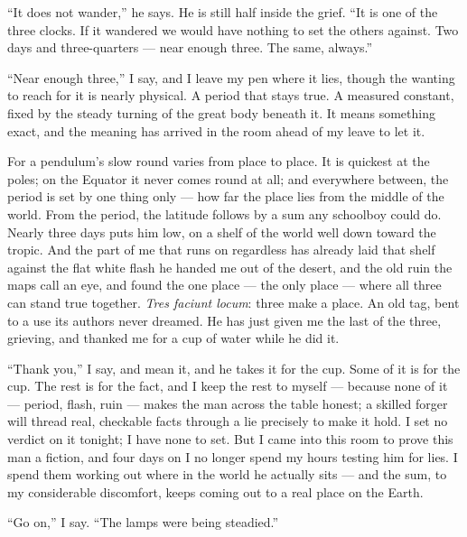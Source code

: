 ``It does not wander,'' he says. He is still half inside the grief. ``It is one of the three clocks. If it wandered we would have nothing to set the others against. Two days and three-quarters --- near enough three. The same, always.''\par

``Near enough three,'' I say, and I leave my pen where it lies, though the wanting to reach for it is nearly physical. A period that stays true. A measured constant, fixed by the steady turning of the great body beneath it. It means something exact, and the meaning has arrived in the room ahead of my leave to let it.\par

For a pendulum's slow round varies from place to place. It is quickest at the poles; on the Equator it never comes round at all; and everywhere between, the period is set by one thing only --- how far the place lies from the middle of the world. From the period, the latitude follows by a sum any schoolboy could do. Nearly three days puts him low, on a shelf of the world well down toward the tropic. And the part of me that runs on regardless has already laid that shelf against the flat white flash he handed me out of the desert, and the old ruin the maps call an eye, and found the one place --- the only place --- where all three can stand true together. \textit{Tres faciunt locum}: three make a place. An old tag, bent to a use its authors never dreamed. He has just given me the last of the three, grieving, and thanked me for a cup of water while he did it.\par

``Thank you,'' I say, and mean it, and he takes it for the cup. Some of it is for the cup. The rest is for the fact, and I keep the rest to myself --- because none of it --- period, flash, ruin --- makes the man across the table honest; a skilled forger will thread real, checkable facts through a lie precisely to make it hold. I set no verdict on it tonight; I have none to set. But I came into this room to prove this man a fiction, and four days on I no longer spend my hours testing him for lies. I spend them working out where in the world he actually sits --- and the sum, to my considerable discomfort, keeps coming out to a real place on the Earth.\par

``Go on,'' I say. ``The lamps were being steadied.''\par

\ornament

